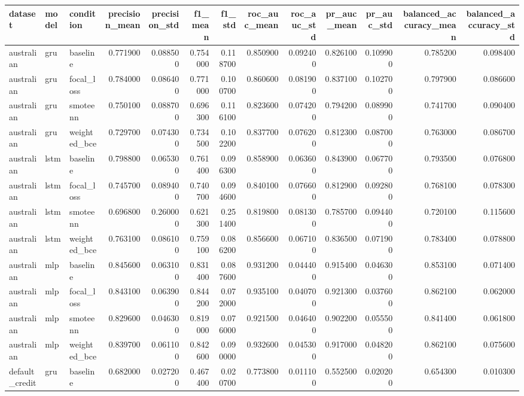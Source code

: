 \begin{tabular}{lllrrrrrrrrrr}
\toprule
dataset & model & condition & precision_mean & precision_std & f1_mean & f1_std & roc_auc_mean & roc_auc_std & pr_auc_mean & pr_auc_std & balanced_accuracy_mean & balanced_accuracy_std \\
\midrule
australian & gru & baseline & 0.771900 & 0.088500 & 0.754000 & 0.118700 & 0.850900 & 0.092400 & 0.826100 & 0.109900 & 0.785200 & 0.098400 \\
australian & gru & focal_loss & 0.784000 & 0.086400 & 0.771000 & 0.100700 & 0.860600 & 0.081900 & 0.837100 & 0.102700 & 0.797900 & 0.086600 \\
australian & gru & smoteenn & 0.750100 & 0.088700 & 0.696300 & 0.116100 & 0.823600 & 0.074200 & 0.794200 & 0.089900 & 0.741700 & 0.090400 \\
australian & gru & weighted_bce & 0.729700 & 0.074300 & 0.734500 & 0.102200 & 0.837700 & 0.076200 & 0.812300 & 0.087000 & 0.763000 & 0.086700 \\
australian & lstm & baseline & 0.798800 & 0.065300 & 0.761400 & 0.096300 & 0.858900 & 0.063600 & 0.843900 & 0.067700 & 0.793500 & 0.076800 \\
australian & lstm & focal_loss & 0.745700 & 0.089400 & 0.740700 & 0.094600 & 0.840100 & 0.076600 & 0.812900 & 0.092800 & 0.768100 & 0.078300 \\
australian & lstm & smoteenn & 0.696800 & 0.260000 & 0.621300 & 0.251400 & 0.819800 & 0.081300 & 0.785700 & 0.094400 & 0.720100 & 0.115600 \\
australian & lstm & weighted_bce & 0.763100 & 0.086100 & 0.759100 & 0.086200 & 0.856600 & 0.067100 & 0.836500 & 0.071900 & 0.783400 & 0.078800 \\
australian & mlp & baseline & 0.845600 & 0.063100 & 0.831400 & 0.087600 & 0.931200 & 0.044400 & 0.915400 & 0.046300 & 0.853100 & 0.071400 \\
australian & mlp & focal_loss & 0.843100 & 0.063900 & 0.844200 & 0.072000 & 0.935100 & 0.040700 & 0.921300 & 0.037600 & 0.862100 & 0.062000 \\
australian & mlp & smoteenn & 0.829600 & 0.046300 & 0.819000 & 0.076000 & 0.921500 & 0.046400 & 0.902200 & 0.055500 & 0.841400 & 0.061800 \\
australian & mlp & weighted_bce & 0.839700 & 0.061100 & 0.842600 & 0.090000 & 0.932600 & 0.045300 & 0.917000 & 0.048200 & 0.862100 & 0.075600 \\
default_credit & gru & baseline & 0.682000 & 0.027200 & 0.467400 & 0.020700 & 0.773800 & 0.011100 & 0.552500 & 0.020200 & 0.654300 & 0.010300 \\

\end{tabular}
